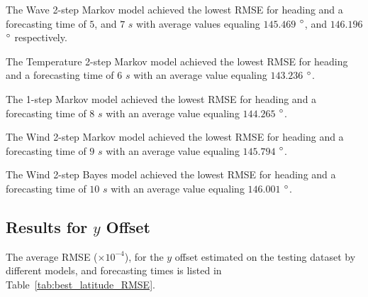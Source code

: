 \documentclass[preprint,12pt]{elsarticle}
\begin{document}
The Wave 2-step Markov model achieved the lowest RMSE for heading and a forecasting time of $5$, and $7$ $s$ with average values equaling $145.469$ $\degree$, and $146.196$ $\degree$ respectively.

The Temperature 2-step Markov model achieved the lowest RMSE for heading and a forecasting time of $6$ $s$ with an average value equaling $143.236$ $\degree$.

The 1-step Markov model achieved the lowest RMSE for heading and a forecasting time of $8$ $s$ with an average value equaling $144.265$ $\degree$.

The Wind 2-step Markov model achieved the lowest RMSE for heading and a forecasting time of $9$ $s$ with an average value equaling $145.794$ $\degree$.

The Wind 2-step Bayes model achieved the lowest RMSE for heading and a forecasting time of $10$ $s$ with an average value equaling $146.001$ $\degree$.

\subsection{Results for $y$ Offset}

The average RMSE ($\times 10^{-4}$), for the $y$ offset estimated on the testing dataset by different models, and forecasting times is listed in Table~\ref{tab:best_latitude_RMSE}.
\end{document}
